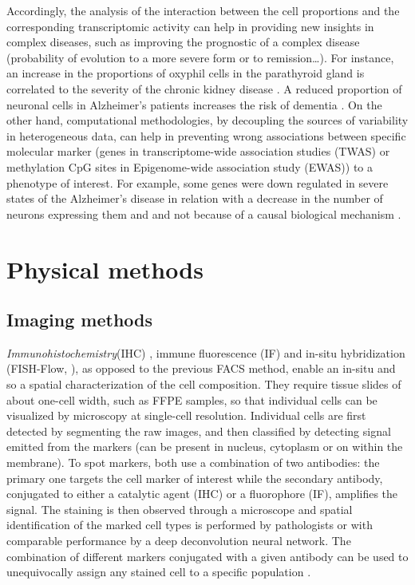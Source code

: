 Accordingly, the analysis of the interaction between the cell
proportions and the corresponding transcriptomic activity can help in
providing new insights in complex diseases, such as improving the
prognostic of a complex disease (probability of evolution to a more
severe form or to remission\ldots). For instance, an increase in the
proportions of oxyphil cells in the parathyroid gland is correlated to
the severity of the chronic kidney disease
\autocite{ding_etal20}. A reduced
proportion of neuronal cells in Alzheimer's patients increases the risk
of dementia \autocite{andrade-moraes_etal13}. On the other hand, computational methodologies, by decoupling
the sources of variability in heterogeneous data, can help in preventing
wrong associations between specific molecular marker (genes in
transcriptome-wide association studies (TWAS) or methylation CpG sites
in Epigenome-wide association study (EWAS)) to a phenotype of interest.
For example, some genes were down regulated in severe states of the
Alzheimer's disease in relation with a decrease in the number of neurons
expressing them and and not because of a causal biological mechanism
\autocite{mathys_etal19}.


\section{Physical methods}
\label{physical-method}


\subsection{Imaging methods}
\label{imaging-methods}

\emph{Immunohistochemistry}(IHC) \autocite{ju_etal13}, immune fluorescence (IF)
and in-situ hybridization (FISH-Flow, \autocite{kuhn_etal11}), as
opposed to the previous FACS method, enable an in-situ and so a spatial
characterization of the cell composition. They require tissue slides of
about one-cell width, such as FFPE samples, so that individual cells can
be visualized by microscopy at single-cell resolution. Individual cells
are first detected by segmenting the raw images, and then classified by
detecting signal emitted from the markers (can be present in nucleus,
cytoplasm or on within the membrane). To spot markers, both use a
combination of two antibodies: the primary one targets the cell marker
of interest while the secondary antibody, conjugated to either a
catalytic agent (IHC) or a fluorophore (IF), amplifies the signal. The
staining is then observed through a microscope and spatial
identification of the marked cell types is performed by pathologists or
with comparable performance by a deep deconvolution neural network. The
combination of different markers conjugated with a given antibody can be
used to unequivocally assign any stained cell to a specific population
\autocite{taube_etal18}.

